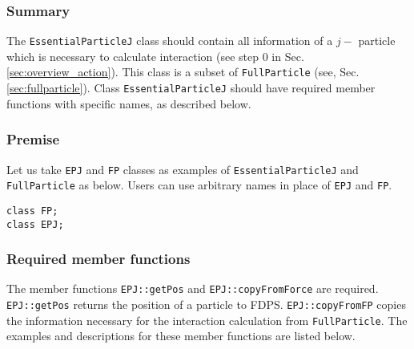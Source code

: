 \subsubsection{Summary}

The \texttt{EssentialParticleJ} class should contain all information of
a $j-$ particle which is necessary to calculate interaction
(see step 0 in Sec. \ref{sec:overview_action}).
This class is a subset of \texttt{FullParticle} (see, Sec. \ref{sec:fullparticle}).
Class \texttt{EssentialParticleJ} should have required member functions
with specific names, as described below.

\subsubsection{Premise}

Let us take \texttt{EPJ} and \texttt{FP} classes as examples of
\texttt{EssentialParticleJ} and \texttt{FullParticle} as below.
Users can use arbitrary names in place of \texttt{EPJ} and \texttt{FP}.

\begin{screen}
\begin{verbatim}
class FP;
class EPJ;
\end{verbatim}
\end{screen}

\subsubsection{Required member functions}


The member functions \texttt{EPJ::getPos} and \texttt{EPJ::copyFromForce} are required.
\texttt{EPJ::getPos} returns the position of a particle to FDPS.
\texttt{EPJ::copyFromFP} copies the information necessary for the interaction calculation from \texttt{FullParticle}.
The examples and descriptions for these member functions are listed below.

